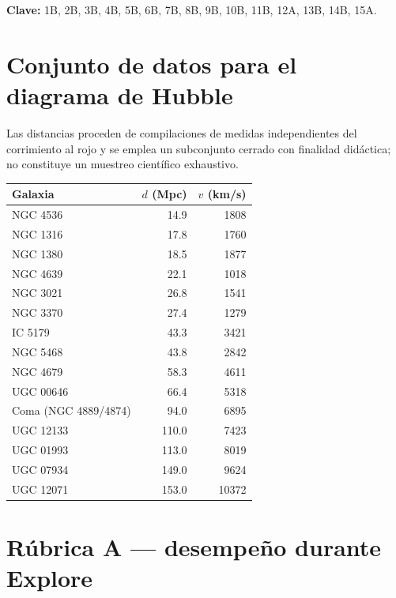 \noindent\textbf{Clave:} 1B, 2B, 3B, 4B, 5B, 6B, 7B, 8B, 9B, 10B, 11B, 12A, 13B, 14B, 15A.

\section*{Conjunto de datos para el diagrama de Hubble}

Las distancias proceden de compilaciones de medidas independientes del corrimiento al rojo y se emplea un subconjunto cerrado con finalidad didáctica; no constituye un muestreo científico exhaustivo.

\begin{center}
\begin{tabular}{|l|r|r|}
\hline
\rowcolor{naranja}\color{white}\textbf{Galaxia} & \color{white}\textbf{$d$ (Mpc)} & \color{white}\textbf{$v$ (km/s)} \\ \hline
NGC 4536 & 14.9 & 1808 \\ \hline
NGC 1316 & 17.8 & 1760 \\ \hline
NGC 1380 & 18.5 & 1877 \\ \hline
NGC 4639 & 22.1 & 1018 \\ \hline
NGC 3021 & 26.8 & 1541 \\ \hline
NGC 3370 & 27.4 & 1279 \\ \hline
IC 5179 & 43.3 & 3421 \\ \hline
NGC 5468 & 43.8 & 2842 \\ \hline
NGC 4679 & 58.3 & 4611 \\ \hline
UGC 00646 & 66.4 & 5318 \\ \hline
Coma (NGC 4889/4874) & 94.0 & 6895 \\ \hline
UGC 12133 & 110.0 & 7423 \\ \hline
UGC 01993 & 113.0 & 8019 \\ \hline
UGC 07934 & 149.0 & 9624 \\ \hline
UGC 12071 & 153.0 & 10372 \\ \hline
\end{tabular}
\end{center}

\clearpage
\section*{Rúbrica A --- desempeño durante Explore}\label{sec:rubricaA}

